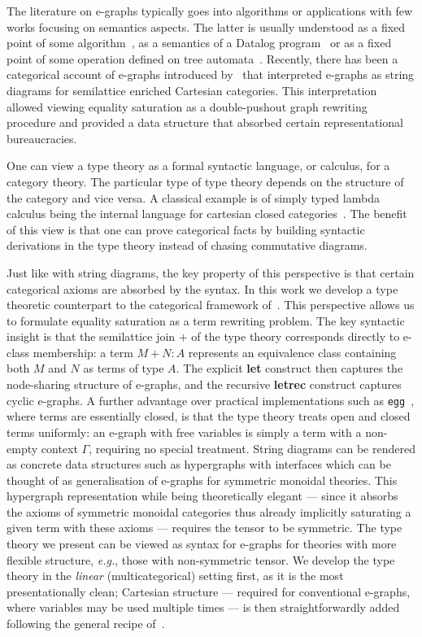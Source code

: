 \documentclass[manuscript, nonacm, anonymous]{acmart}
\begin{document}
The literature on e-graphs typically goes into algorithms or applications with few works focusing on semantics aspects.
The latter is usually understood as a fixed point of some algorithm~\cite{EggPaper}, as a semantics of a Datalog program~\cite{zhang_relational_2022} or as a fixed point of some operation defined on tree automata~\cite{tree_automata_e_graphs}.
Recently, there has been a categorical account of e-graphs introduced by~\citet{tiurin2025equivalencehypergraphsdporewriting} that interpreted e-graphs as string diagrams for semilattice enriched Cartesian categories.
This interpretation allowed viewing equality saturation as a double-pushout graph rewriting procedure and provided a data structure that absorbed certain representational bureaucracies.

One can view a type theory as a formal syntactic language, or calculus, for a category theory.
The particular type of type theory depends on the structure of the category and vice versa.
A classical example is of simply typed lambda calculus being the internal language for cartesian closed categories~\cite{LambekLambda}.
The benefit of this view is that one can prove categorical facts by building syntactic derivations in the type theory instead of chasing commutative diagrams.

Just like with string diagrams, the key property of this perspective is that certain categorical axioms are absorbed by the syntax.
In this work we develop a type theoretic counterpart to the categorical framework of~\citet{tiurin2025equivalencehypergraphsdporewriting}.
This perspective allows us to formulate equality saturation as a term rewriting problem.
The key syntactic insight is that the semilattice join $+$ of the type theory corresponds directly to e-class membership: a term $M + N : A$ represents an equivalence class containing both $M$ and $N$ as terms of type $A$.
The explicit \textbf{let} construct then captures the node-sharing structure of e-graphs, and the recursive \textbf{letrec} construct captures cyclic e-graphs.
A further advantage over practical implementations such as \texttt{egg}~\cite{EggPaper}, where terms are essentially closed, is that the type theory treats open and closed terms uniformly: an e-graph with free variables is simply a term with a non-empty context $\Gamma$, requiring no special treatment.
String diagrams can be rendered as concrete data structures such as hypergraphs with interfaces which can be thought of as generalisation of e-graphs for symmetric monoidal theories.
This hypergraph representation while being theoretically elegant --- since it absorbs the axioms of symmetric monoidal categories thus already implicitly saturating a given term with these axioms --- requires the tensor to be symmetric.
The type theory we present can be viewed as syntax for e-graphs for theories with more flexible structure, \textit{e.g.}, those with non-symmetric tensor.
We develop the type theory in the \emph{linear} (multicategorical) setting first, as it is the most presentationally clean; Cartesian structure --- required for conventional e-graphs, where variables may be used multiple times --- is then straightforwardly added following the general recipe of~\citet{shulman2016categorical}.
\end{document}
